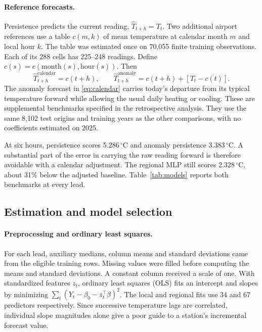 \documentclass[11pt,letterpaper]{article}
\newcommand{\celsius}{\ensuremath{^{\circ}\mathrm{C}}}\newcommand{\code}[1]{\texttt{\small #1}}
\begin{document}
\paragraph{Reference forecasts.}
Persistence predicts the current reading, $\widehat T_{t+h}=T_t$. Two additional airport references use a table $c(m,k)$ of mean temperature at calendar month $m$ and local hour $k$. The table was estimated once on 70,055 finite training observations. Each of its 288 cells has 225--248 readings. Define $c(s)=c(\mathrm{month}(s),\mathrm{hour}(s))$. Then
\begin{equation}\label{eq:calendar}
 \widehat T^{\mathrm{calendar}}_{t+h}=c(t+h),\qquad
 \widehat T^{\mathrm{anomaly}}_{t+h}=c(t+h)+[T_t-c(t)].
\end{equation}
The anomaly forecast in \eqref{eq:calendar} carries today's departure from its typical temperature forward while allowing the usual daily heating or cooling. These are supplemental benchmarks specified in the retrospective analysis. They use the same 8,102 test origins and training years as the other comparisons, with no coefficients estimated on 2025.

At six hours, persistence scores 5.286\,\celsius{} and anomaly persistence 3.383\,\celsius. A substantial part of the error in carrying the raw reading forward is therefore avoidable with a calendar adjustment. The regional MLP still scores 2.328\,\celsius, about 31\% below the adjusted baseline. Table~\ref{tab:models} reports both benchmarks at every lead.


\subsection{Estimation and model selection}\label{estimators}
\paragraph{Preprocessing and ordinary least squares.}
For each lead, auxiliary medians, column means and standard deviations came from the eligible training rows. Missing values were filled before computing the means and standard deviations. A constant column received a scale of one. With standardized features $z_t$, ordinary least squares (OLS) fits an intercept and slopes by minimizing $\sum_t(Y_t-\beta_0-z_t^\top\beta)^2$. The local and regional fits use 34 and 67 predictors respectively. Since successive temperature lags are correlated, individual slope magnitudes alone give a poor guide to a station's incremental forecast value.
\end{document}
